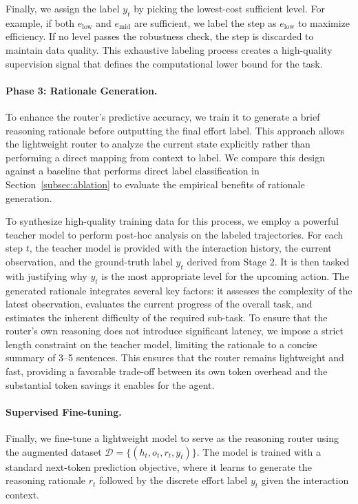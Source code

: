 \documentclass{article}
\theoremstyle{plain}
\theoremstyle{definition}
\theoremstyle{remark}
\begin{document}
Finally, we assign the label $y_t$ by picking the lowest-cost sufficient level. For example, if both $e_{\mathrm{low}}$ and $e_{\mathrm{mid}}$ are sufficient, we label the step as $e_{\mathrm{low}}$ to maximize efficiency. If no level passes the robustness check, the step is discarded to maintain data quality. This exhaustive labeling process creates a high-quality supervision signal that defines the computational lower bound for the task.

\paragraph{Phase 3: Rationale Generation.}

To enhance the router's predictive accuracy, we train it to generate a brief reasoning rationale before outputting the final effort label. This approach allows the lightweight router to analyze the current state explicitly rather than performing a direct mapping from context to label. We compare this design against a baseline that performs direct label classification in Section~\ref{subsec:ablation} to evaluate the empirical benefits of rationale generation.

To synthesize high-quality training data for this process, we employ a powerful teacher model to perform post-hoc analysis on the labeled trajectories. For each step $t$, the teacher model is provided with the interaction history, the current observation, and the ground-truth label $y_t$ derived from Stage 2. It is then tasked with justifying why $y_t$ is the most appropriate level for the upcoming action. The generated rationale integrates several key factors: it assesses the complexity of the latest observation, evaluates the current progress of the overall task, and estimates the inherent difficulty of the required sub-task. To ensure that the router's own reasoning does not introduce significant latency, we impose a strict length constraint on the teacher model, limiting the rationale to a concise summary of 3--5 sentences. 
This ensures that the router remains lightweight and fast, providing a favorable trade-off between its own token overhead and the substantial token savings it enables for the agent.

\paragraph{Supervised Fine-tuning.}

Finally, we fine-tune a lightweight model to serve as the reasoning router using the augmented dataset $\mathcal{D} = \{ (h_t, o_t, r_t, y_t) \}$. The model is trained with a standard next-token prediction objective, where it learns to generate the reasoning rationale $r_t$ followed by the discrete effort label $y_t$ given the interaction context.
\end{document}
